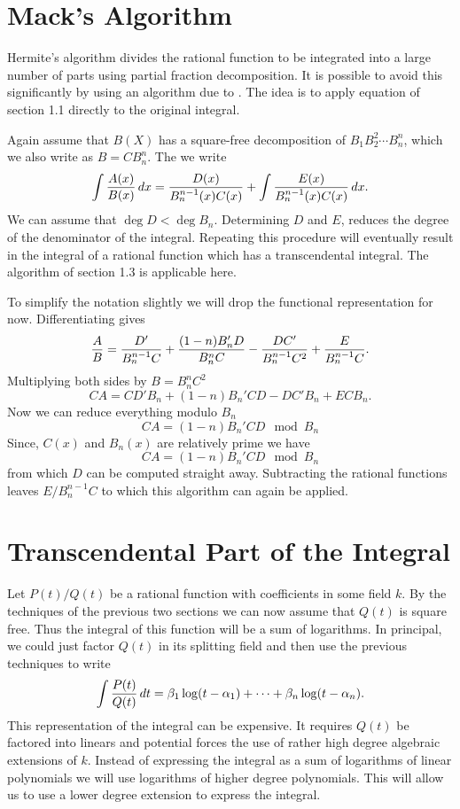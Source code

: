 \section{Mack's Algorithm}

Hermite's algorithm divides the rational function to be integrated
into a large number of parts using partial fraction decomposition.  It
is possible to avoid this significantly by using an algorithm due to
{\Mack} \cite{Mack1975-sq}.  The idea is to apply equation
 of section 1.1 directly to the original integral.

Again assume that $B(X)$ has a square-free decomposition of $B_1 B_2^2
\cdots B_n^n$, which we also write as $B = C B_n^n$.  The we write
\begin{equation}\label{Int:Mack:PF:Eq}
\int {A(x) \over B(x)} \, dx = {D(x) \over B_n^{n-1}(x) C(x)}
+ \int {E(x) \over B_n^{n-1}(x) C(x)}\, dx.
\end{equation}
We can assume that $\deg D < \deg B_n$.  Determining $D$ and $E$,
reduces the degree of the denominator of the integral.  Repeating this
procedure will eventually result in the integral of a rational function
which has a transcendental integral.  The algorithm of section 1.3 is
applicable here.

To simplify the notation slightly we will drop the functional representation
for now.  Differentiating  gives
\[
{A \over B} =
  {D' \over B_n^{n-1} C} + {(1-n) B_n' D \over B_n^n C} -
  {D C' \over B_n^{n-1} C^2} + {E \over B_n^{n-1} C}.
\]
Multiplying both sides by $B = B_n^n C^2$
\[
CA = CD' B_n + (1-n) B_n' CD - D C' B_n + E CB_n.
\]
Now we can reduce everything modulo $B_n$
\[
CA = (1 - n) B_n' CD \mod{B_n}
\]
Since, $C(x)$ and $B_n(x)$ are relatively prime we have
\[
CA = (1 - n) B_n' CD \mod{B_n}
\]
from which $D$ can be computed straight away.  Subtracting the
rational functions leaves $E/B_n^{n-1}C$ to which this algorithm can
again be applied.

\section{Transcendental Part of the Integral}

Let $P(t)/Q(t)$ be a rational function with coefficients in some field $k$.
By the techniques of the previous two sections we can now assume that $Q(t)$
is square free.  Thus the integral of this function will be a sum of
logarithms.  In principal, we could just factor $Q(t)$ in its splitting
field and then use the previous techniques to write
\[
\int {P(t) \over Q(t)} \, dt = \beta_1 \log (t - \alpha_1) + \cdots +
\beta_n \log (t - \alpha_n).
\]
This representation of the integral can be expensive.  It requires $Q(t)$ be
factored into linears and potential forces the use of rather high degree
algebraic extensions of $k$.  Instead of expressing the integral as a sum of
logarithms of linear polynomials we will use logarithms of higher degree
polynomials.  This will allow us to use a lower degree extension to express
the integral.  

